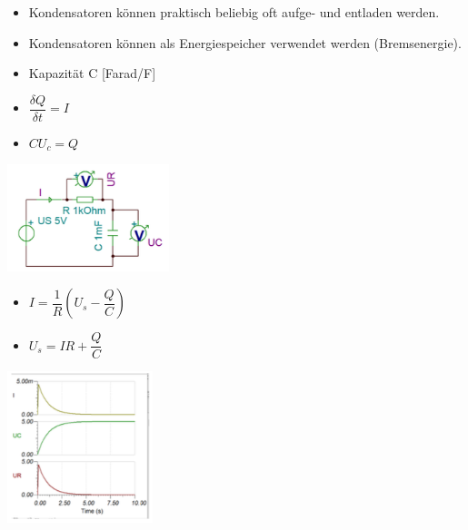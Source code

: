 \documentclass[8pt,a4paper]{scrartcl}
\begin{document}
\begin{multicols*}{3}
\begin{multicols*}{2}
				\begin{itemize}\itemsep0pt
					\item Kondensatoren können praktisch beliebig oft aufge- und entladen werden.
					\item Kondensatoren können als Energiespeicher verwendet werden (Bremsenergie).
					\item Kapazität C [Farad/F]
					\item $\dfrac{\delta Q} {\delta t} = I$
					\item $CU_{c}=Q$
				\end{itemize}
				
			 \end{multicols*}
			 
			 \begin{multicols*}{2}
				\includegraphics[height=3.1cm]{img/kondensator2.png} 
				
				\begin{itemize}\itemsep0pt
					\item $I = \dfrac{1}{R}(U_{s}-\dfrac{Q}{C})$
					\item $U_{s}=IR+\dfrac{Q}{C}$
				\end{itemize}
				
				\includegraphics[height=4.4cm]{img/kondensator3.png} 

			 \end{multicols*}


\end{multicols*}
\end{document}
